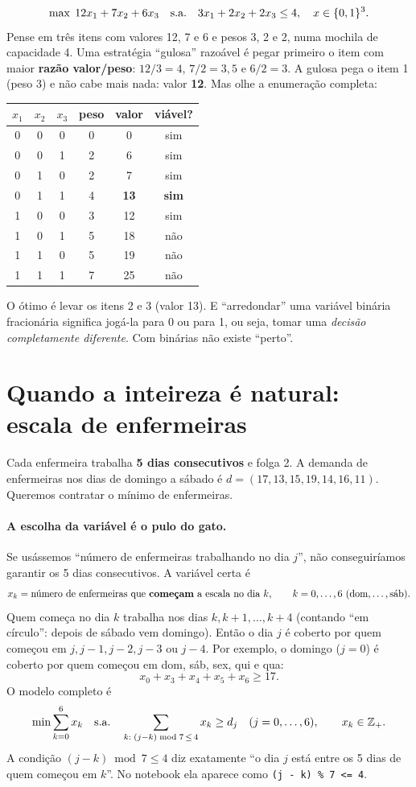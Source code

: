 \[
\max\; 12x_1 + 7x_2 + 6x_3 \quad \text{s.a.}\quad 3x_1 + 2x_2 + 2x_3 \le 4,\quad x\in\{0,1\}^3.
\]
Pense em três itens com valores 12, 7 e 6 e pesos 3, 2 e 2, numa mochila de capacidade 4. Uma estratégia
``gulosa'' razoável é pegar primeiro o item com maior \textbf{razão valor/peso}: $12/3=4$, $7/2=3{,}5$ e $6/2=3$. A
gulosa pega o item 1 (peso 3) e não cabe mais nada: valor \textbf{12}. Mas olhe a enumeração completa:
\begin{center}
\begin{tabular}{ccc|cc|c}
\toprule
$x_1$ & $x_2$ & $x_3$ & peso & valor & viável?\\
\midrule
0&0&0&0&0&sim\\ 0&0&1&2&6&sim\\ 0&1&0&2&7&sim\\ 0&1&1&4&\textbf{13}&\textbf{sim}\\
1&0&0&3&12&sim\\ 1&0&1&5&18&não\\ 1&1&0&5&19&não\\ 1&1&1&7&25&não\\
\bottomrule
\end{tabular}
\end{center}
O ótimo é levar os itens 2 e 3 (valor 13). E ``arredondar'' uma variável binária fracionária significa jogá-la
para 0 ou para 1, ou seja, tomar uma \emph{decisão completamente diferente}. Com binárias não existe ``perto''.

\section{Quando a inteireza é natural: escala de enfermeiras}
\label{sec:enfermeiras}

Cada enfermeira trabalha \textbf{5 dias consecutivos} e folga 2. A demanda de enfermeiras nos dias de domingo a
sábado é $d=(17,13,15,19,14,16,11)$. Queremos contratar o mínimo de enfermeiras.

\paragraph{A escolha da variável é o pulo do gato.} Se usássemos ``número de enfermeiras trabalhando no dia $j$'', não
conseguiríamos garantir os 5 dias consecutivos. A variável certa é
\[
x_k = \text{número de enfermeiras que \textbf{começam} a escala no dia } k,\qquad k=0,\dots,6\ (\text{dom},\dots,\text{sáb}).
\]
Quem começa no dia $k$ trabalha nos dias $k, k+1, \dots, k+4$ (contando ``em círculo'': depois de sábado vem
domingo). Então o dia $j$ é coberto por quem começou em $j, j-1, j-2, j-3$ ou $j-4$. Por exemplo, o domingo ($j=0$)
é coberto por quem começou em dom, sáb, sex, qui e qua:
\[
x_0 + x_3 + x_4 + x_5 + x_6 \ge 17.
\]
O modelo completo é
\[
\min \sum_{k=0}^{6} x_k \quad\text{s.a.}\quad \sum_{k:\;(j-k)\bmod 7\,\le\,4} x_k \ge d_j\quad (j=0,\dots,6),\qquad x_k\in\mathbb{Z}_+.
\]
A condição $(j-k) \bmod 7 \le 4$ diz exatamente ``o dia $j$ está entre os 5 dias de quem começou em $k$''. No notebook
ela aparece como \texttt{(j - k) \% 7 <= 4}.

